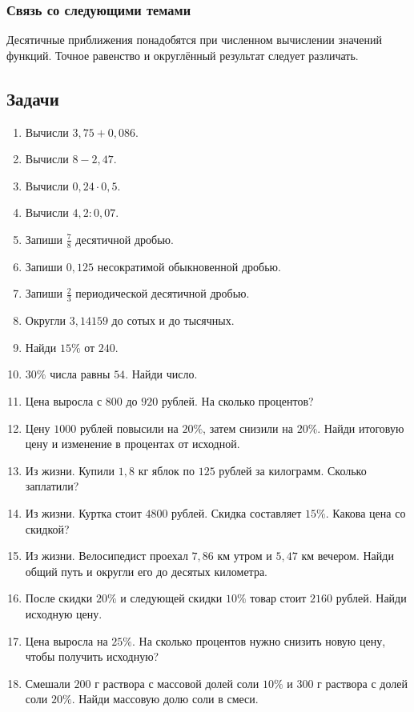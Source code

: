 \documentclass[12pt,a4paper]{article}
\theoremstyle{definition}
\theoremstyle{plain}
\theoremstyle{remark}
\newcommand{\starmark}{\ensuremath{{}^{\ast}}}
\begin{document}
\subsubsection*{Связь со следующими темами}
Десятичные приближения понадобятся при численном вычислении значений функций. Точное равенство и округлённый результат следует различать.
\subsection*{Задачи}
\begin{enumerate}[label=\thesection.\arabic*.,leftmargin=2.8em,itemsep=12pt]
\item Вычисли \(3{,}75 + 0{,}086\).
\item Вычисли \(8 - 2{,}47\).
\item Вычисли \(0{,}24 \cdot  0{,}5\).
\item Вычисли \(4{,}2 : 0{,}07\).
\item Запиши \(\frac{7}{8}\) десятичной дробью.
\item Запиши \(0{,}125\) несократимой обыкновенной дробью.
\item Запиши \(\frac{2}{3}\) периодической десятичной дробью.
\item Округли \(3{,}14159\) до сотых и до тысячных.
\item Найди \(15 \%\) от \(240\).
\item \(30 \%\) числа равны \(54\). Найди число.
\item Цена выросла с \(800\) до \(920\) рублей. На сколько процентов?
\item Цену \(1000\) рублей повысили на \(20 \%\), затем снизили на \(20 \%\). Найди итоговую цену и изменение в процентах от исходной.
\item Из жизни. Купили \(1{,}8\) кг яблок по \(125\) рублей за килограмм. Сколько заплатили?
\item Из жизни. Куртка стоит \(4800\) рублей. Скидка составляет \(15 \%\). Какова цена со скидкой?
\item Из жизни. Велосипедист проехал \(7{,}86\) км утром и \(5{,}47\) км вечером. Найди общий путь и округли его до десятых километра.
\item[\textbf{4.16.}\starmark] После скидки \(20 \%\) и следующей скидки \(10 \%\) товар стоит \(2160\) рублей. Найди исходную цену.
\item[\textbf{4.17.}\starmark] Цена выросла на \(25 \%\). На сколько процентов нужно снизить новую цену, чтобы получить исходную?
\item[\textbf{4.18.}\starmark] Смешали \(200\) г раствора с массовой долей соли \(10 \%\) и \(300\) г раствора с долей соли \(20 \%\). Найди массовую долю соли в смеси.
\end{enumerate}
\clearpage
\end{document}
